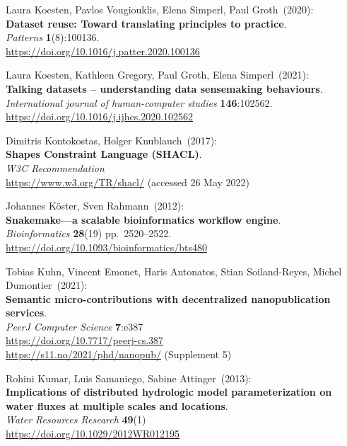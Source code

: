 \begin{thebibliography}{9}
Laura Koesten, Pavlos Vougiouklis, Elena Simperl, Paul Groth~(2020): \\
\textbf{Dataset reuse: Toward translating principles to practice}.\\
\emph{Patterns} \textbf{1}(8):100136.\\
\url{https://doi.org/10.1016/j.patter.2020.100136}

Laura Koesten, Kathleen Gregory, Paul Groth, Elena Simperl~(2021): \\
\textbf{Talking datasets -- understanding data sensemaking
behaviours}.\\
\emph{International journal of human-computer studies}
\textbf{146}:102562.\\
\url{https://doi.org/10.1016/j.ijhcs.2020.102562}

Dimitris Kontokostas, Holger Knublauch~(2017): \\
\textbf{Shapes {Constraint Language} ({SHACL})}.\\
\emph{W3C Recommendation}\\
\url{https://www.w3.org/TR/shacl/} (accessed 26 May 2022)

Johannes Köster, Sven Rahmann~(2012): \\
\textbf{Snakemake—a scalable bioinformatics workflow engine}.\\
\emph{Bioinformatics} \textbf{28}(19) pp.~2520--2522.\\
\url{https://doi.org/10.1093/bioinformatics/bts480}

Tobias Kuhn, Vincent Emonet, Haris Antonatos, Stian
Soiland-Reyes, Michel Dumontier~(2021): \\
\textbf{Semantic micro-contributions
with decentralized nanopublication services}.\\
\emph{PeerJ Computer Science} \textbf{7}:e387\\
\url{https://doi.org/10.7717/peerj-cs.387} \\
\url{https://s11.no/2021/phd/nanopub/} (Supplement 5)

Rohini Kumar, Luis Samaniego, Sabine Attinger~(2013): \\
\textbf{Implications of distributed hydrologic model parameterization on water fluxes at multiple scales and locations}.\\
\emph{Water Resources Research} \textbf{49}(1) \\
\url{https://doi.org/10.1029/2012WR012195}


\end{thebibliography}
